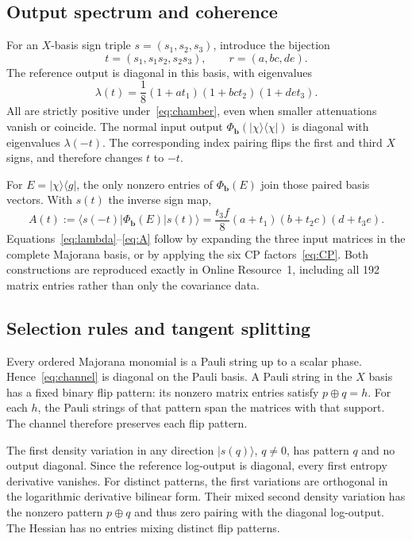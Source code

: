 \documentclass[11pt,a4paper]{article}
\newcommand{\ket}[1]{\lvert #1\rangle}
\newcommand{\bra}[1]{\langle #1\rvert}
\newcommand{\PhiB}{\Phi_{\boldsymbol b}}
\begin{document}
\subsection{Output spectrum and coherence}
For an $X$-basis sign triple $s=(s_1,s_2,s_3)$, introduce the bijection
\begin{equation}
 t=(s_1,s_1s_2,s_2s_3),\qquad r=(a,bc,de).
\end{equation}
The reference output is diagonal in this basis, with eigenvalues
\begin{equation}
 \lambda(t)=\frac18(1+at_1)(1+bct_2)(1+det_3).
 \label{eq:lambda}
\end{equation}
All are strictly positive under~\eqref{eq:chamber}, even when smaller
attenuations vanish or coincide. The normal input output
$\PhiB(\ket\chi\bra\chi)$ is diagonal with eigenvalues $\lambda(-t)$.
The corresponding index pairing flips the first and third $X$ signs,
and therefore changes $t$ to $-t$.

For $E=\ket\chi\bra g$, the only nonzero entries of $\PhiB(E)$
join those paired basis vectors. With $s(t)$ the inverse sign map,
\begin{equation}
 A(t):=\bra{s(-t)}\PhiB(E)\ket{s(t)}
 =\frac{t_3 f}{8}(a+t_1)(b+t_2c)(d+t_3e).
 \label{eq:A}
\end{equation}
Equations~\eqref{eq:lambda}--\eqref{eq:A} follow by expanding
the three input matrices in the complete Majorana basis, or by
applying the six CP factors~\eqref{eq:CP}. Both constructions
are reproduced exactly in Online Resource~1, including all 192
matrix entries rather than only the covariance data.

\subsection{Selection rules and tangent splitting}
Every ordered Majorana monomial is a Pauli string up to a scalar
phase. Hence~\eqref{eq:channel} is diagonal on the Pauli basis.
A Pauli string in the $X$ basis has a fixed binary flip pattern:
its nonzero matrix entries satisfy $p\mathbin{\oplus}q=h$.
For each $h$, the Pauli strings of that pattern span the matrices
with that support. The channel therefore preserves each flip pattern.

The first density variation in any direction $\ket{s(q)}$, $q\ne0$,
has pattern $q$ and no output diagonal. Since the reference
log-output is diagonal, every first entropy derivative vanishes.
For distinct patterns, the first variations are orthogonal in the
logarithmic derivative bilinear form. Their mixed second density
variation has the nonzero pattern $p\mathbin{\oplus}q$ and
thus zero pairing with the diagonal log-output. The Hessian
has no entries mixing distinct flip patterns.
\end{document}
